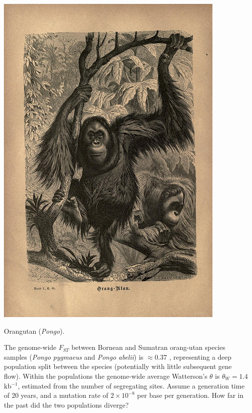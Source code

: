 \begin{marginfigure}
\begin{center}
\includegraphics[width= 0.8 \textwidth]{illustration_images/Genetic_drift/Orang/7971889392_d32b45668b_z.jpg}
\end{center}
\caption{Orangutan ({\it Pongo}). } \label{fig:Orang}  
\end{marginfigure} 


\begin{question}  %
  The genome-wide $F_{ST}$ between Bornean and Sumatran orang-utan species samples  ({\it Pongo pygmaeus} and {\it Pongo abelii}) is $\approx 0.37$ \citep{locke2011}, representing a deep population split between the species (potentially with little subsequent gene flow). Within the populations the genome-wide average Watterson's $\theta$ is $\theta_W=1.4$kb$^{-1}$, estimated from the number of segregating sites. Assume a generation time of 20 years, and a mutation rate of $2 \times 10^{-8}$ per base per generation. How far in the past did the two populations diverge?
\end{question}



